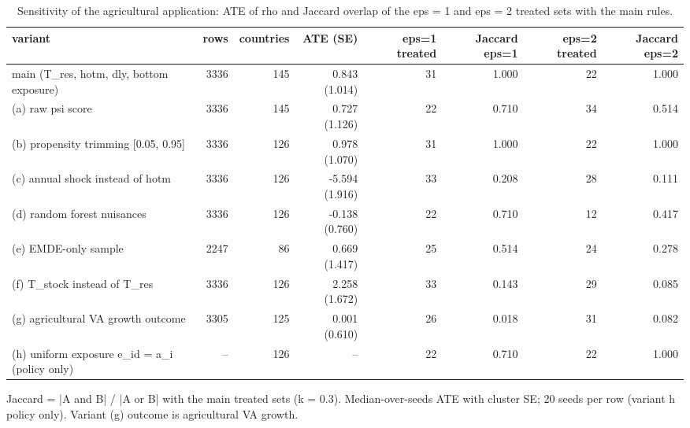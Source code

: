 \begin{table}[htbp]
\centering
\caption{Sensitivity of the agricultural application: ATE of rho and Jaccard overlap of the eps = 1 and eps = 2 treated sets with the main rules.}
\label{tab:agri_sensitivity}
\begin{tabular}{lrrrrrrr}
\toprule
variant & rows & countries & ATE (SE) & eps=1 treated & Jaccard eps=1 & eps=2 treated & Jaccard eps=2 \\
\midrule
main (T\_res, hotm, dly, bottom exposure) & 3336 & 145 & 0.843 (1.014) & 31 & 1.000 & 22 & 1.000 \\
(a) raw psi score & 3336 & 145 & 0.727 (1.126) & 22 & 0.710 & 34 & 0.514 \\
(b) propensity trimming [0.05, 0.95] & 3336 & 126 & 0.978 (1.070) & 31 & 1.000 & 22 & 1.000 \\
(c) annual shock instead of hotm & 3336 & 126 & -5.594 (1.916) & 33 & 0.208 & 28 & 0.111 \\
(d) random forest nuisances & 3336 & 126 & -0.138 (0.760) & 22 & 0.710 & 12 & 0.417 \\
(e) EMDE-only sample & 2247 & 86 & 0.669 (1.417) & 25 & 0.514 & 24 & 0.278 \\
(f) T\_stock instead of T\_res & 3336 & 126 & 2.258 (1.672) & 33 & 0.143 & 29 & 0.085 \\
(g) agricultural VA growth outcome & 3305 & 125 & 0.001 (0.610) & 26 & 0.018 & 31 & 0.082 \\
(h) uniform exposure e\_id = a\_i (policy only) & -- & 126 & -- & 22 & 0.710 & 22 & 1.000 \\
\bottomrule
\end{tabular}
\par\smallskip\footnotesize Jaccard = |A and B| / |A or B| with the main treated sets (k = 0.3). Median-over-seeds ATE with cluster SE; 20 seeds per row (variant h policy only). Variant (g) outcome is agricultural VA growth.
\end{table}
